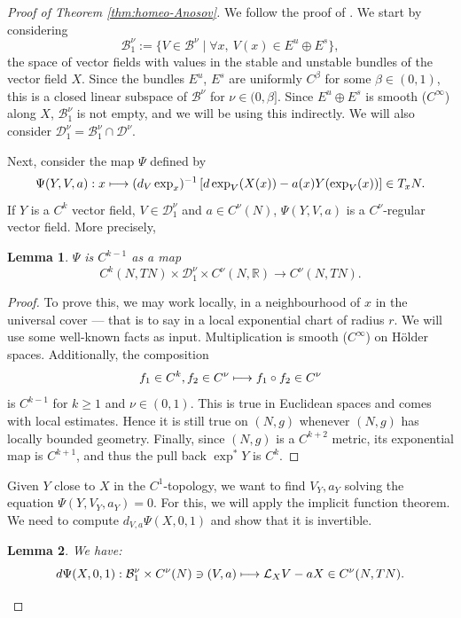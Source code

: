 \documentclass[10pt]{amsart}
\newcommand\mto{\mathchoice{\longmapsto}{\mapsto}{\mapsto}{\mapsto}}
\newcommand{\R}{\mathbb{R}}
\theoremstyle{plain}
\newtheorem{lemma}{Lemma}[section]
\theoremstyle{definition}
\begin{document}
\begin{proof}[Proof of Theorem \ref{thm:homeo-Anosov}]
We follow the proof of \cite{DeLaLlave-Marco-Moryon-86}. We start by considering
\[
\mathcal{B}_1^\nu:= \{ V \in \mathcal{B}^\nu\mid \forall x,\ V(x) \in E^u \oplus E^s\},
\]
the space of vector fields with values in the stable and unstable bundles of the vector field $X$.
Since the bundles $E^u$, $E^s$ are uniformly $C^{\beta}$ for some $\beta\in (0,1)$, this is a closed linear subspace of $\mathcal{B}^\nu$ for $\nu \in (0, \beta]$. Since $E^u\oplus E^s$ is smooth ($C^\infty$) along $X$, $\mathcal{B}_1^\nu$ is not empty, and we will be using this indirectly. We will also consider $\mathcal{D}_1^\nu = \mathcal{B}_1^\nu \cap \mathcal{D}^\nu$.

Next, consider the map $\Psi$ defined by
\[
\Psi(Y,V,a) : x \mto (d_V\exp_x)^{-1}\left[d\exp_{V}(X(x)) - a(x) Y(\exp_{V}(x)) \right]\in T_x N.
\]
If $Y$ is a $C^{k}$ vector field, $V \in \mathcal{D}_1^\nu$ and $a\in C^\nu(N)$, $\Psi(Y,V,a)$ is a $C^\nu$-regular vector field. More precisely,

\begin{lemma}
$\Psi$ is $C^{k-1}$ as a map
\[
C^k(N,TN) \times \mathcal{D}_1^\nu \times C^\nu(N,\R) \to C^\nu(N, TN).
\]
\end{lemma}

\begin{proof}
To prove this, we may work locally, in a neighbourhood of $x$ in the universal cover --- that is to say in a local exponential chart of radius $r$. We will use some well-known facts as input. Multiplication is smooth ($C^\infty$) on H\"older spaces. Additionally, the composition
\[
f_1\in C^k, f_2 \in C^\nu \mto f_1 \circ f_2 \in C^\nu
\]
is $C^{k-1}$ for $k\geq 1$ and $\nu \in (0,1)$. This is true in Euclidean spaces and comes with local estimates. Hence it is still true on $(N,g)$ whenever $(N,g)$ has locally bounded geometry. Finally, since $(N,g)$ is a $C^{k+2}$ metric, its exponential map is $C^{k+1}$, and thus the pull back $\exp^\ast Y$ is $C^k$.
\end{proof}

Given $Y$ close to $X$ in the $C^1$-topology, we want to find $V_Y,a_Y$ solving the equation $\Psi(Y,V_Y,a_Y) = 0$. For this, we will apply the implicit function theorem. We need to compute $d_{V,a} \Psi(X,0, 1)$ and show that it is invertible.

\begin{lemma}
We have:
\[
d \Psi(X,0, 1) : \mathcal{B}_1^\nu\times C^\nu (N) \ni (V,a) \mto \mathcal{L}_X V - a X \in C^\nu(N,TN).
\]
\end{lemma}


\end{proof}
\end{document}
